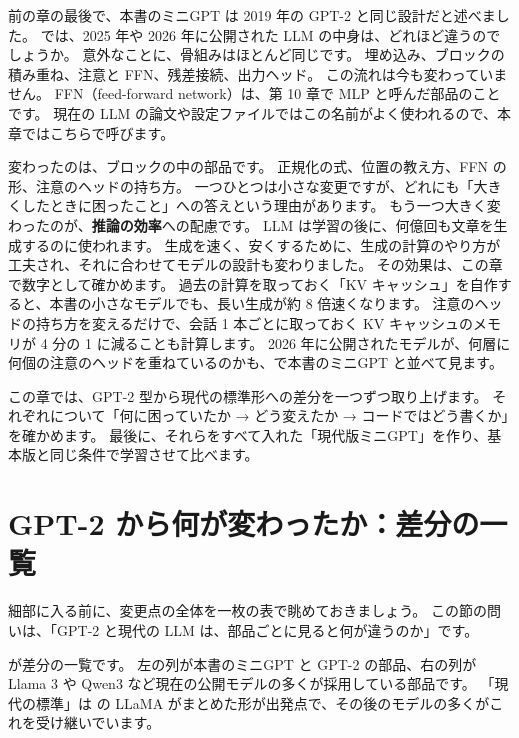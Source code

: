 前の章の最後で、本書のミニGPT は 2019 年の GPT-2 と同じ設計だと述べました。
では、2025 年や 2026 年に公開された LLM の中身は、どれほど違うのでしょうか。
意外なことに、骨組みはほとんど同じです。
埋め込み、ブロックの積み重ね、注意と FFN、残差接続、出力ヘッド。
この流れは今も変わっていません。
FFN（feed-forward network）は、第 10 章で MLP と呼んだ部品のことです。
現在の LLM の論文や設定ファイルではこの名前がよく使われるので、本章ではこちらで呼びます。

変わったのは、ブロックの中の部品です。
正規化の式、位置の教え方、FFN の形、注意のヘッドの持ち方。
一つひとつは小さな変更ですが、どれにも「大きくしたときに困ったこと」への答えという理由があります。
もう一つ大きく変わったのが、\textbf{推論の効率}への配慮です。
LLM は学習の後に、何億回も文章を生成するのに使われます。
生成を速く、安くするために、生成の計算のやり方が工夫され、それに合わせてモデルの設計も変わりました。
その効果は、この章で数字として確かめます。
過去の計算を取っておく「KV キャッシュ」を自作すると、本書の小さなモデルでも、長い生成が約 8 倍速くなります。
注意のヘッドの持ち方を変えるだけで、会話 1 本ごとに取っておく KV キャッシュのメモリが 4 分の 1 に減ることも計算します。
2026 年に公開されたモデルが、何層に何個の注意のヘッドを重ねているのかも、で本書のミニGPT と並べて見ます。

この章では、GPT-2 型から現代の標準形への差分を一つずつ取り上げます。
それぞれについて「何に困っていたか → どう変えたか → コードではどう書くか」を確かめます。
最後に、それらをすべて入れた「現代版ミニGPT」を作り、基本版と同じ条件で学習させて比べます。

\section{GPT-2 から何が変わったか：差分の一覧}\label{sec:ma-diff}

細部に入る前に、変更点の全体を一枚の表で眺めておきましょう。
この節の問いは、「GPT-2 と現代の LLM は、部品ごとに見ると何が違うのか」です。

が差分の一覧です。
左の列が本書のミニGPT と GPT-2 の部品、右の列が Llama 3 や Qwen3 など現在の公開モデルの多くが採用している部品です。
「現代の標準」は \cite{touvron2023llama} の LLaMA がまとめた形が出発点で、その後のモデルの多くがこれを受け継いでいます。


